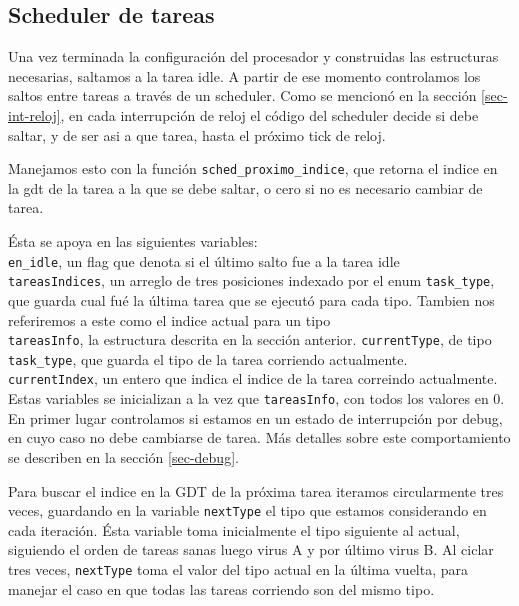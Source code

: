 \subsection{Scheduler de tareas}

Una vez terminada la configuración del procesador y construidas las estructuras necesarias, saltamos a la tarea idle. A partir de ese momento controlamos los saltos entre tareas a través de un scheduler.
Como se mencionó en la sección \ref{sec-int-reloj}, en cada interrupción de reloj el código del scheduler decide si debe saltar, y de ser asi a que tarea, hasta el próximo tick de reloj.

Manejamos esto con la función \verb|sched_proximo_indice|, que retorna el indice en la gdt de la tarea a la que se debe saltar, o cero si no es necesario cambiar de tarea. 

Ésta se apoya en las siguientes variables: \\

\verb|en_idle|, un flag que denota si el último salto fue a la tarea idle\\
\verb|tareasIndices|, un arreglo de tres posiciones indexado por el enum \verb|task_type|, que guarda cual fué la última tarea que se ejecutó para cada tipo. Tambien nos referiremos a este como el indice actual para un tipo\\
\verb|tareasInfo|, la estructura descrita en la sección anterior.
\verb|currentType|, de tipo \verb|task_type|, que guarda el tipo de la tarea corriendo actualmente.\\
\verb|currentIndex|, un entero que indica el indice de la tarea correindo actualmente.\\

Estas variables se inicializan a la vez que \verb|tareasInfo|, con todos los valores en 0.
En primer lugar controlamos si estamos en un estado de interrupción por debug, en cuyo caso no debe cambiarse de tarea. Más detalles sobre este comportamiento se describen en la sección \ref{sec-debug}.

Para buscar el indice en la GDT de la próxima tarea iteramos circularmente tres veces, guardando en la variable \verb|nextType| el tipo que estamos considerando en cada iteración. Ésta variable toma inicialmente el tipo siguiente al actual, siguiendo el orden de tareas sanas luego virus A y por último virus B. Al ciclar tres veces, \verb|nextType| toma el valor del tipo actual en la última vuelta, para manejar el caso en que todas las tareas corriendo son del mismo tipo.

